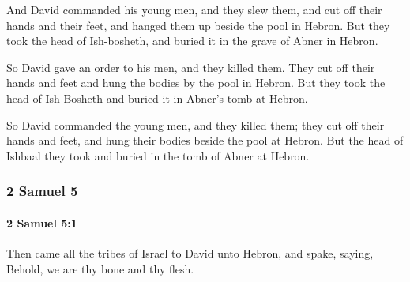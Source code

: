 			\begin{versebox}
					\item[BHS] 
					\item[ASV] And David commanded his young men, and they slew them, and cut off their hands and their feet, and hanged them up beside the pool in Hebron. But they took the head of Ish-bosheth, and buried it in the grave of Abner in Hebron.
					\item[NIV] So David gave an order to his men, and they killed them. They cut off their hands and feet and hung the bodies by the pool in Hebron. But they took the head of Ish-Bosheth and buried it in Abner’s tomb at Hebron.
					\item[NRSV] So David commanded the young men, and they killed them; they cut off their hands and feet, and hung their bodies beside the pool at Hebron. But the head of Ishbaal they took and buried in the tomb of Abner at Hebron.
			\end{versebox}
	\subsubsection{2 Samuel 5} %
		\label{2SAMUEL-5}

		\paragraph{2 Samuel 5:1} %
			\label{2SAMUEL-5-1}

			Then came all the tribes of Israel to David unto Hebron, and spake, saying, Behold, we are thy bone and thy flesh.

